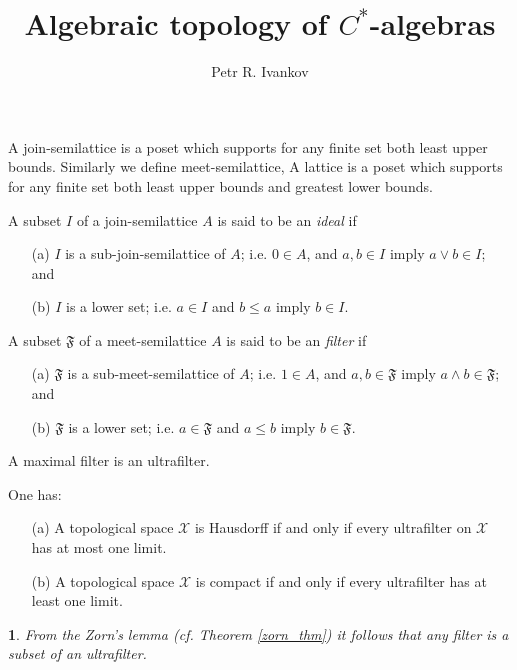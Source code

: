\documentclass{beamer}
\title{Algebraic topology of $C^*$-algebras}
\institute
{
Algebras in analysis
}
\author{Petr R. Ivankov  }
\theoremstyle{plain}
\newtheorem{empt}[prop]{}%
\newcommand{\sX}{\mathcal{X}}       %
\begin{document}
\begin{frame}
  \titlepage
\end{frame}
\begin{frame}
		\begin{definition}\label{lattice_defn}\cite{johnstone:stone_spaces} 
	
	A \alert{join-semilattice} is a poset which supports for any finite set both  least upper bounds. Similarly we define 	\alert{meet-semilattice},	 A \alert{lattice} is a poset which supports for any finite set both  least upper bounds and greatest lower  bounds. 
\end{definition}
\begin{definition}\label{ideal_defn}\cite{johnstone:stone_spaces} 
	A subset $I$ of a join-semilattice $A$ is said to be an {\it ideal} if
	\begin{enumerate}
		\item [(a)] $I$ is a sub-join-semilattice of $A$; i.e. $0\in A$, and $a, b \in I$ imply  	$a \vee b \in I$; and
		\item [(b)] $I$ is a lower set; i.e. $a \in I$ and $b \le a$ imply $b \in I$.  
	\end{enumerate}
\end{definition}
\begin{definition}\label{filter_defn}\cite{johnstone:stone_spaces} 
	A subset $\mathfrak F$ of a meet-semilattice $A$ is said to be an {\it filter} if
	\begin{enumerate}
		\item [(a)] $\mathfrak F$ is a sub-meet-semilattice of $A$; i.e. $1\in A$, and $a, b \in \mathfrak F$  imply  	$a \wedge b \in \mathfrak F$; and
		\item [(b)] $\mathfrak F$ is a lower set; i.e. $a \in \mathfrak F$ and $ a\le b$ imply $b \in \mathfrak F$.  
	\end{enumerate}
\end{definition}
\end{frame}
\begin{frame}
		\begin{definition}\label{ultra_filter_defn}\cite{johnstone:stone_spaces} 
	A maximal filter is an \alert{ultrafilter}.
\end{definition}

\begin{lemma}\label{top_ultra_thm}\cite{johnstone:stone_spaces}
	One has:
	\begin{enumerate}
		\item [(a)] 	A topological space $\sX$ is Hausdorff if and only if every ultrafilter on $\sX$ has at most one limit.
		\item[(b)]   	A topological space $\sX$ is compact if and only if every ultrafilter has at least one limit.
	\end{enumerate} 
	
\end{lemma}
\begin{empt}
	From the Zorn's lemma (cf. Theorem \ref{zorn_thm}) it follows that any filter is a subset of an ultrafilter.
	\end{empt}

\end{frame}
\end{document}
